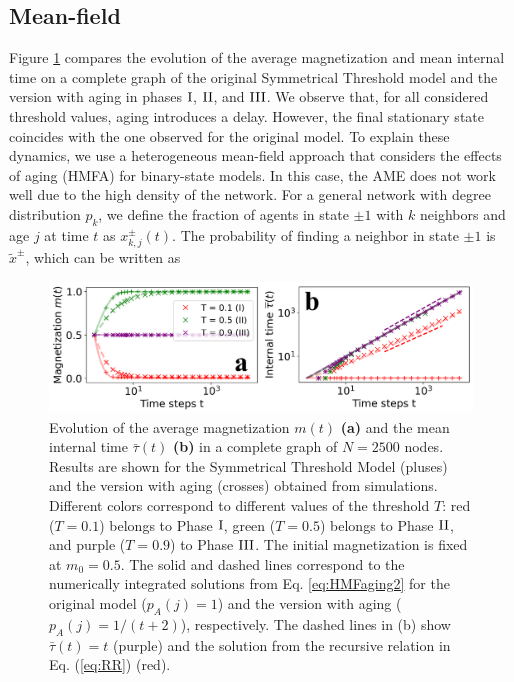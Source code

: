 \subsection{Mean-field}
Figure \ref{fig:COM_AGING} compares the evolution of the average magnetization and mean internal time on a complete graph of the original Symmetrical Threshold model and the version with aging in phases ${\rm I}$, ${\rm II}$, and ${\rm III}$. We observe that, for all considered threshold values, aging introduces a delay. However, the final stationary state coincides with the one observed for the original model. To explain these dynamics, we use a heterogeneous mean-field approach that considers the effects of aging (HMFA) \cite{chen-2020} for binary-state models. In this case, the AME does not work well due to the high density of the network. For a general network with degree distribution $p_k$, we define the fraction of agents in state $\pm 1$ with $k$ neighbors and age $j$ at time $t$ as $x^{\pm}_{k,j} (t)$. The probability of finding a neighbor in state $\pm 1$ is $\tilde{x}^{\pm}$, which can be written as 
\begin{figure}
	\centering \captionsetup{font=sf}
	\includegraphics[width=\textwidth]{Figs/Aging_STM/FIG4.pdf}
	\caption[Aging effects in the complete graph]{\label{fig:COM_AGING} Evolution of the average magnetization $m(t)$ \textbf{(a)} and the mean internal time $\bar{\tau}(t)$ \textbf{(b)} in a complete graph of $N=2500$ nodes. Results are shown for the Symmetrical Threshold Model (pluses) and the version with aging (crosses) obtained from simulations. Different colors correspond to different values of the threshold $T$: red ($T = 0.1$) belongs to Phase ${\rm I}$, green ($T = 0.5$) belongs to Phase ${\rm II}$, and purple ($T = 0.9$) to Phase ${\rm III}$. The initial magnetization is fixed at $m_0 = 0.5$. The solid and dashed lines correspond to the numerically integrated solutions from Eq. \ref{eq:HMFaging2} for the original model ($p_A(j) = 1$) and the version with aging ($p_A(j) = 1/(t+2)$), respectively. The dashed lines in (b) show $\bar{\tau}(t) = t$ (purple) and the solution from the recursive relation in Eq. (\ref{eq:RR}) (red).}
\end{figure}

